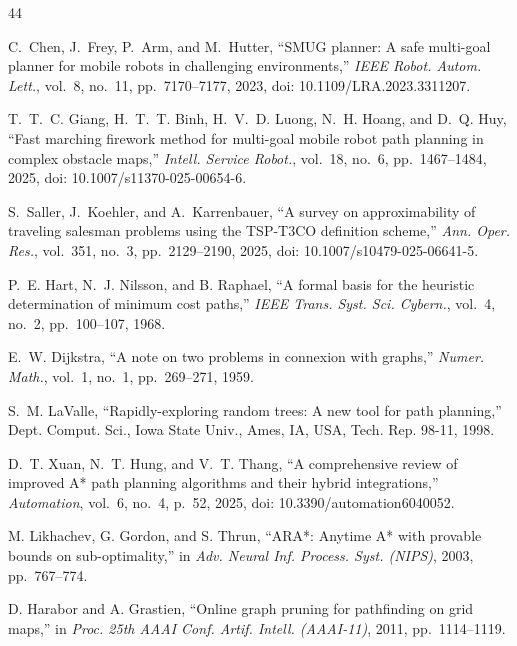 \documentclass[lettersize,journal]{IEEEtran}
\begin{document}
\begin{thebibliography}{44}


C.~Chen, J.~Frey, P.~Arm, and M.~Hutter, ``SMUG planner: A safe multi-goal planner for mobile robots in challenging environments,'' \textit{IEEE Robot. Autom. Lett.}, vol.~8, no.~11, pp.~7170--7177, 2023, doi: 10.1109/LRA.2023.3311207.


T.~T.~C. Giang, H.~T.~T. Binh, H.~V.~D. Luong, N.~H. Hoang, and D.~Q. Huy, ``Fast marching firework method for multi-goal mobile robot path planning in complex obstacle maps,'' \textit{Intell. Service Robot.}, vol.~18, no.~6, pp.~1467--1484, 2025, doi: 10.1007/s11370-025-00654-6.


S.~Saller, J.~Koehler, and A.~Karrenbauer, ``A survey on approximability of traveling salesman problems using the TSP-T3CO definition scheme,'' \textit{Ann. Oper. Res.}, vol.~351, no.~3, pp.~2129--2190, 2025, doi: 10.1007/s10479-025-06641-5.


P.~E. Hart, N.~J. Nilsson, and B. Raphael, ``A formal basis for the heuristic determination of minimum cost paths,'' \textit{IEEE Trans. Syst. Sci. Cybern.}, vol.~4, no.~2, pp.~100--107, 1968.


E.~W. Dijkstra, ``A note on two problems in connexion with graphs,'' \textit{Numer. Math.}, vol.~1, no.~1, pp.~269--271, 1959.


S.~M. LaValle, ``Rapidly-exploring random trees: A new tool for path planning,'' Dept. Comput. Sci., Iowa State Univ., Ames, IA, USA, Tech. Rep. 98-11, 1998.


D.~T. Xuan, N.~T. Hung, and V.~T. Thang, ``A comprehensive review of improved A* path planning algorithms and their hybrid integrations,'' \textit{Automation}, vol.~6, no.~4, p.~52, 2025, doi: 10.3390/automation6040052.


M. Likhachev, G. Gordon, and S. Thrun, ``ARA*: Anytime A* with provable bounds on sub-optimality,'' in \textit{Adv. Neural Inf. Process. Syst. (NIPS)}, 2003, pp.~767--774.


D. Harabor and A. Grastien, ``Online graph pruning for pathfinding on grid maps,'' in \textit{Proc. 25th AAAI Conf. Artif. Intell. (AAAI-11)}, 2011, pp.~1114--1119.


\end{thebibliography}
\end{document}

